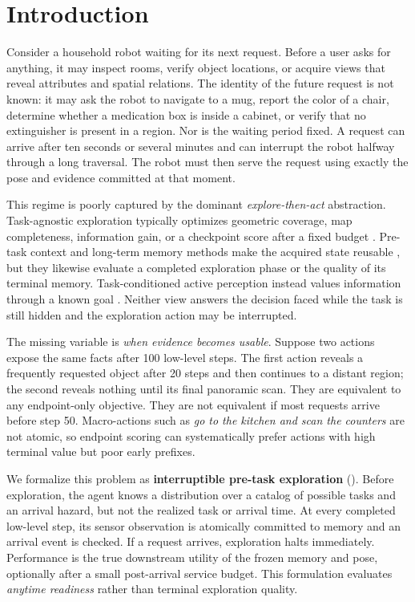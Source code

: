 \section{Introduction}
\label{sec:introduction}

Consider a household robot waiting for its next request.
Before a user asks for anything, it may inspect rooms, verify object locations, or acquire views that reveal attributes and spatial relations.
The identity of the future request is not known: it may ask the robot to navigate to a mug, report the color of a chair, determine whether a medication box is inside a cabinet, or verify that no extinguisher is present in a region.
Nor is the waiting period fixed.
A request can arrive after ten seconds or several minutes and can interrupt the robot halfway through a long traversal.
The robot must then serve the request using exactly the pose and evidence committed at that moment.

This regime is poorly captured by the dominant \emph{explore-then-act} abstraction.
Task-agnostic exploration typically optimizes geometric coverage, map completeness, information gain, or a checkpoint score after a fixed budget
\citep{yamauchi1997frontier,chaplot2020ans,ye2026look,zhang2026theory}.
Pre-task context and long-term memory methods make the acquired state reusable
\citep{cai2026autocontext,wang2026lmee,jiang2024roboexp,chen2026abot},
but they likewise evaluate a completed exploration phase or the quality of its terminal memory.
Task-conditioned active perception instead values information through a known goal
\citep{liu2025activevoo,lee2026obsgraph}.
Neither view answers the decision faced while the task is still hidden and the exploration action may be interrupted.

The missing variable is \emph{when evidence becomes usable}.
Suppose two actions expose the same facts after 100 low-level steps.
The first action reveals a frequently requested object after 20 steps and then continues to a distant region; the second reveals nothing until its final panoramic scan.
They are equivalent to any endpoint-only objective.
They are not equivalent if most requests arrive before step 50.
Macro-actions such as \emph{go to the kitchen and scan the counters} are not atomic, so endpoint scoring can systematically prefer actions with high terminal value but poor early prefixes.

We formalize this problem as \textbf{interruptible pre-task exploration} (\taskname).
Before exploration, the agent knows a distribution over a catalog of possible tasks and an arrival hazard, but not the realized task or arrival time.
At every completed low-level step, its sensor observation is atomically committed to memory and an arrival event is checked.
If a request arrives, exploration halts immediately.
Performance is the true downstream utility of the frozen memory and pose, optionally after a small post-arrival service budget.
This formulation evaluates \emph{anytime readiness} rather than terminal exploration quality.

